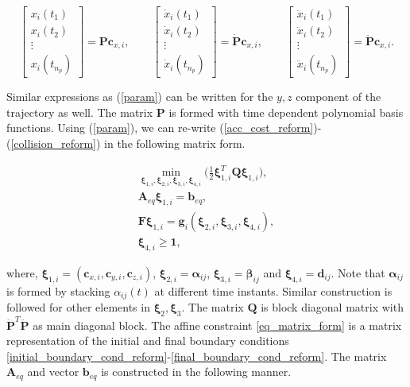 \begin{equation}
\begin{bmatrix}
x_{i}(t_1)\\
x_{i}(t_2)\\
\vdots\\
x_{i}(t_{n_{p}})
\end{bmatrix} =\textbf{P} \textbf{c}_{x,i}, \qquad
\begin{bmatrix}
\dot{x}_{i}(t_1)\\
\dot{x}_{i}(t_2)\\
\vdots\\
\dot{x}_{i}(t_{n_{p}})
\end{bmatrix} = \dot{\textbf{P}}\textbf{c}_{x,i}, \qquad
\begin{bmatrix}
\ddot{x}_{i}(t_1)\\
\ddot{x}_{i}(t_2)\\
\vdots\\
\ddot{x}_{i}(t_{n_{p}})
\end{bmatrix} = \ddot{\textbf{P}}\textbf{c}_{x,i}.
\label{param}
\end{equation}

\noindent Similar expressions as (\ref{param}) can be written for the $y, z$ component of the trajectory as well. The matrix $\textbf{P}$ is formed with time dependent polynomial basis functions. Using (\ref{param}), we can re-write (\ref{acc_cost_reform})-(\ref{collision_reform}) in the following matrix form. 

\begin{subequations}
\begin{align}
 \min_{\boldsymbol{\xi}_{1,i}, \boldsymbol{\xi}_{2,i}, \boldsymbol{\xi}_{3,i}, \boldsymbol{\xi}_{4,i}} \Big(\frac{1}{2}\boldsymbol{\xi}_{1,i}^T\textbf{Q}\boldsymbol{\xi}_{1,i} \Big)\label{cost_matrix_form},  \\
  \textbf{A}_{eq}\boldsymbol{\xi}_{1,i} = \textbf{b}_{eq},   \label{eq_matrix_form}\\
  \textbf{F}\boldsymbol{\xi}_{1,i} = \textbf{g}_{i}(\boldsymbol{\xi}_{2,i},\boldsymbol{\xi}_{3,i}, \boldsymbol{\xi}_{4,i} ) \label{non_convex_equality_matrix-form},\\
 \boldsymbol{\xi}_{4,i}\geq \textbf{1}, \label{d_bound_matrix_form}
\end{align}
\end{subequations}

\noindent where, $\boldsymbol{\xi}_{1,i} = (\textbf{c}_{x,i}, \textbf{c}_{y,i}, \textbf{c}_{z,i}) $, $\boldsymbol{\xi}_{2,i} = \boldsymbol{\alpha}_{ij}$,  $\boldsymbol{\xi}_{3,i} = \boldsymbol{\beta}_{ij}$ and $\boldsymbol{\xi}_{4,i} = \textbf{d}_{ij}$. Note that $\boldsymbol{\alpha}_{ij}$ is formed by stacking $\alpha_{ij}(t)$ at different time instants. Similar construction is followed for other elements in $\boldsymbol{\xi}_2, \boldsymbol{\xi}_3$. The matrix $\textbf{Q}$ is block diagonal matrix with $\ddot{\textbf{P}}^T\ddot{\textbf{P}}$ as main diagonal block. The affine constraint \eqref{eq_matrix_form} is a matrix representation of the initial and final boundary conditions \eqref{initial_boundary_cond_reform}-\ref{final_boundary_cond_reform}. The matrix $\textbf{A}_{eq}$ and vector $\textbf{b}_{eq}$ is constructed in the following manner.

